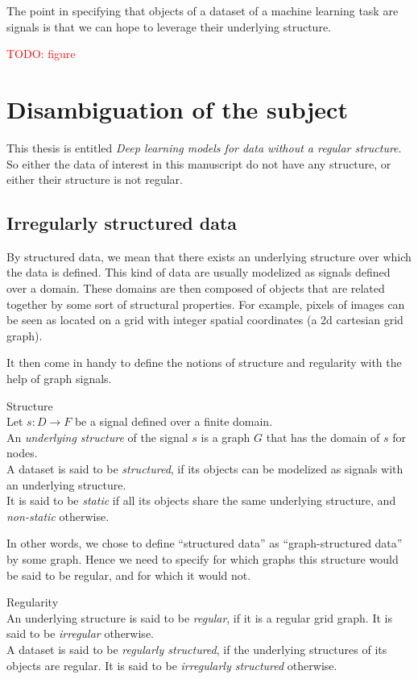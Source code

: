 The point in specifying that objects of a dataset of a machine learning task are signals is that we can hope to leverage their underlying structure.

\textcolor{red}{TODO: figure}

\section{Disambiguation of the subject}

This thesis is entitled \emph{Deep learning models for data without a regular structure}.
So either the data of interest in this manuscript do not have any structure, or either their structure is not regular.

\subsection{Irregularly structured data}

By structured data, we mean that there exists an underlying structure over which the data is defined. This kind of data are usually modelized as signals defined over a domain. These domains are then composed of objects that are related together by some sort of structural properties. For example, pixels of images can be seen as located on a grid with integer spatial coordinates (a 2d cartesian grid graph).

It then come in handy to define the notions of structure and regularity with the help of graph signals.

\begin{definition}{Structure}\\
  Let $s: D \rightarrow F$ be a signal defined over a finite domain.\\
  An \emph{underlying structure} of the signal $s$ is a graph $G$ that has the domain of $s$ for nodes.\\
  A dataset is said to be \emph{structured}, if its objects can be modelized as signals with an underlying structure.\\
  It is said to be \emph{static} if all its objects share the same underlying structure, and \emph{non-static} otherwise.
\end{definition}

In other words, we chose to define ``structured data'' as ``graph-structured data'' by some graph. Hence we need to specify for which graphs this structure would be said to be regular, and for which it would not.

\begin{definition}{Regularity}\\
An underlying structure is said to be \emph{regular}, if it is a regular grid graph.
It is said to be \emph{irregular} otherwise.\\
A dataset is said to be \emph{regularly structured}, if the underlying structures of its objects are regular.
It is said to be \emph{irregularly structured} otherwise.
\end{definition}


